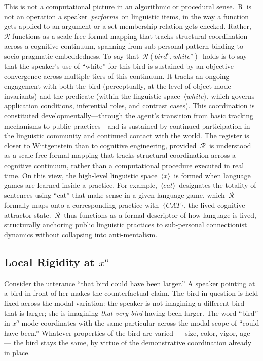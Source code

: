 \documentclass[12pt,a4paper]{article}
\begin{document}
This is not a computational picture in an algorithmic or procedural sense.~R~is not an operation a speaker~\emph{performs}~on linguistic items, in the way a function gets applied to an argument or a set-membership relation gets checked. Rather,~\(\mathcal{R}\) functions as a scale-free formal mapping that tracks structural coordination across a cognitive continuum, spanning from sub-personal pattern-binding to socio-pragmatic embeddedness. To say that~\(\mathcal{R}(bird^o,white^c)\)~holds is to say that the speaker's use of ``white'' for this bird is sustained by an objective convergence across multiple tiers of this continuum. It tracks an ongoing engagement with both the bird (perceptually, at the level of object-mode invariants) and the predicate (within the linguistic space~\(⟨white⟩\), which governs application conditions, inferential roles, and contrast cases). This coordination is constituted developmentally---through the agent's transition from basic tracking mechanisms to public practices---and is sustained by continued participation in the linguistic community and continued contact with the world. The register is closer to Wittgenstein than to cognitive engineering, provided~\(\mathcal{R}\)~is understood as a scale-free formal mapping that tracks structural coordination across a cognitive continuum, rather than a computational procedure executed in real time. On this view, the high-level linguistic space~\(⟨x⟩\)~is formed when language games are learned inside a practice. For example,~\(⟨cat⟩\)~designates the totality of sentences using ``cat'' that make sense in a given language game, which~\(\mathcal{R}\) formally maps onto a corresponding practice with~\(\{CAT\}\), the lived cognitive attractor state.~\(\mathcal{R}\)~thus functions as a formal descriptor of how language is lived, structurally anchoring public linguistic practices to sub-personal connectionist dynamics without collapsing into anti-mentalism.

\subsection{\texorpdfstring{Local Rigidity at \(x^o\)}{Local Rigidity at x\^{}o}}\label{local-rigidity-at-xo}

Consider the utterance ``that bird could have been larger.'' A speaker pointing at a bird in front of her makes the counterfactual claim. The bird in question is held fixed across the modal variation: the speaker is not imagining a different bird that is larger; she is imagining \emph{that very bird} having been larger. The word ``bird'' in \(x^o\) mode coordinates with the same particular across the modal scope of ``could have been.'' Whatever properties of the bird are varied --- size, color, vigor, age --- the bird stays the same, by virtue of the demonstrative coordination already in place.
\end{document}
